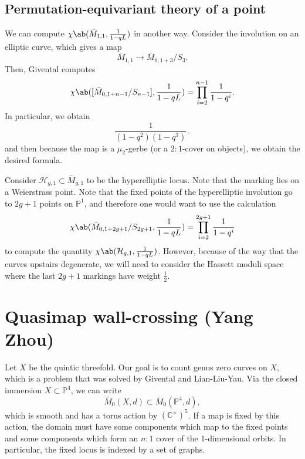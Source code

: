 \documentclass{amsart}
\theoremstyle{definition}
\theoremstyle{remark}
\theoremstyle{plain}
\theoremstyle{definition}
\theoremstyle{remark}
\newcommand{\C}{\mathbb{C}}
\renewcommand{\P}{\mathbb{P}}
\newcommand{\mc}[1]{\mathcal{#1}}
\newcommand{\1}{\mathbf{1}}
\newcommand{\2}{\mathbf{2}}
\newcommand{\3}{\mathbf{3}}
\begin{document}
\subsection{Permutation-equivariant theory of a point}%
\label{sub:Permutation-equivariant theory of a point}

We can compute \(\chi\ab(\bar{M}_{1,1}, \frac{1}{1-q L})\) in another way. Consider the involution on an elliptic curve, which gives a map
\[ \bar{M}_{1,1} \to \bar{M}_{0,1+3}/S_3. \]
Then, Givental computes
\[ \chi\ab([\bar{M}_{0,1+n-1}/S_{n-1}], \frac{1}{1-qL}) = \prod_{i=2}^{n-1} \frac{1}{1-q^i}. \]
In particular, we obtain
\[ \frac{1}{(1-q^2)(1-q^3)}, \]
and then because the map is a \(\mu_2\)-gerbe (or a \(2:1\)-cover on objects), we obtain the desired formula.

Consider \(\mc{H}_{g,1} \subset \bar{M}_{g,1}\) to be the hyperelliptic locus. Note that the marking lies on a Weierstrass point. Note that the fixed points of the hyperelliptic involution go to \(2g+1\) points on \(\P^1\), and therefore one would want to use the calculation
\[ \chi\ab(\bar{M}_{0,1+2g+1}/S_{2g+1}, \frac{1}{1-q L}) = \prod_{i=2}^{2g+1} \frac{1}{1-q^i} \]
to compute the quantity
\(\chi\ab(\mc{H}_{g,1}, \frac{1}{1-qL})\). However, because of the way that the curves upstairs degenerate, we will need to consider the Hassett moduli space where the last \(2g+1\) markings have weight \(\frac{1}{2}\).
 






\section{Quasimap wall-crossing (Yang Zhou)}%
\label{sec:Quasimap wall-crossing (Yang Zhou)}

Let \(X\) be the quintic threefold. Our goal is to count genus zero curves on \(X\), which is a problem that was solved by Givental and Lian-Liu-Yau. Via the closed immersion \(X \subset \P^4\), we can write
\[ \bar{M}_0(X, d) \subset \bar{M}_0(\P^4, d), \]
which is smooth and has a torus action by \((\C^{\times})^5\). If a map is fixed by this action, the domain must have some components which map to the fixed points and some components which form an \(n :1\) cover of the \(1\)-dimensional orbits. In particular, the fixed locus is indexed by a set of graphs.
\end{document}
